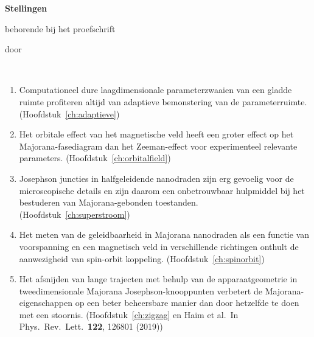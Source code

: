 \documentclass{dissertation}
\begin{document}
\clearpage
{

\begin{center}

{\Large\titlefont\bfseries Stellingen}

\smallskip

behorende bij het proefschrift

\smallskip

{\makeatletter
\titlestyle\bfseries\large\@title
\makeatother}

{\makeatletter
\ifx\@subtitle\undefined\else
    \titlefont\titleshape\@subtitle
\fi
\makeatother}

\smallskip

door

\smallskip

\makeatletter
{\large\titlefont\bfseries\@firstname\ {\titleshape\@lastname}}
\makeatother

\end{center}

\begin{enumerate}
\itemsep-0.08em

\item Computationeel dure laagdimensionale parameterzwaaien van een gladde ruimte profiteren altijd van adaptieve bemonstering van de parameterruimte. (Hoofdstuk~\ref{ch:adaptieve})

\item Het orbitale effect van het magnetische veld heeft een groter effect op het Majorana-fasediagram dan het Zeeman-effect voor experimenteel relevante parameters. (Hoofdstuk~\ref{ch:orbitalfield})

\item Josephson juncties in halfgeleidende nanodraden zijn erg gevoelig voor de microscopische details en zijn daarom een onbetrouwbaar hulpmiddel bij het bestuderen van Majorana-gebonden toestanden. (Hoofdstuk~\ref{ch:superstroom})

\item Het meten van de geleidbaarheid in Majorana nanodraden als een functie van voorspanning en een magnetisch veld in verschillende richtingen onthult de aanwezigheid van spin-orbit koppeling. (Hoofdstuk~\ref{ch:spinorbit})

\item Het afsnijden van lange trajecten met behulp van de apparaatgeometrie in tweedimensionale Majorana Josephson-knooppunten verbetert de Majorana-eigenschappen op een beter beheersbare manier dan door hetzelfde te doen met een stoornis. (Hoofdstuk~\ref{ch:zigzag} en Haim et al.~In Phys.~Rev.~Lett.~\textbf{122}, 126801 (2019))


\end{enumerate}}
\end{document}

